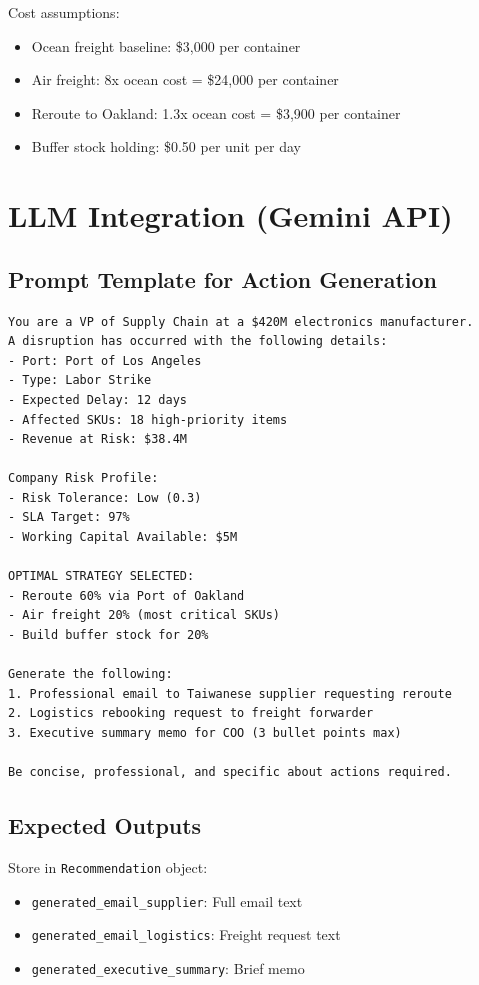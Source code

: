 \documentclass[11pt]{article}
\begin{document}
Cost assumptions:
\begin{itemize}
    \item Ocean freight baseline: \$3,000 per container
    \item Air freight: 8x ocean cost = \$24,000 per container
    \item Reroute to Oakland: 1.3x ocean cost = \$3,900 per container
    \item Buffer stock holding: \$0.50 per unit per day
\end{itemize}

\section{LLM Integration (Gemini API)}

\subsection{Prompt Template for Action Generation}

\begin{lstlisting}[basicstyle=\ttfamily\small]
You are a VP of Supply Chain at a $420M electronics manufacturer.
A disruption has occurred with the following details:
- Port: Port of Los Angeles
- Type: Labor Strike
- Expected Delay: 12 days
- Affected SKUs: 18 high-priority items
- Revenue at Risk: $38.4M

Company Risk Profile:
- Risk Tolerance: Low (0.3)
- SLA Target: 97%
- Working Capital Available: $5M

OPTIMAL STRATEGY SELECTED:
- Reroute 60% via Port of Oakland
- Air freight 20% (most critical SKUs)
- Build buffer stock for 20%

Generate the following:
1. Professional email to Taiwanese supplier requesting reroute
2. Logistics rebooking request to freight forwarder
3. Executive summary memo for COO (3 bullet points max)

Be concise, professional, and specific about actions required.
\end{lstlisting}

\subsection{Expected Outputs}

Store in \texttt{Recommendation} object:
\begin{itemize}
    \item \texttt{generated\_email\_supplier}: Full email text
    \item \texttt{generated\_email\_logistics}: Freight request text
    \item \texttt{generated\_executive\_summary}: Brief memo
\end{itemize}
\end{document}
